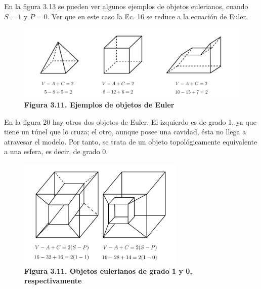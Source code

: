 En la figura 3.13 se pueden ver algunos ejemplos de objetos eulerianos, cuando $S = 1$ y $P = 0$. Ver que en este caso la Ec. 16 se reduce a la ecuación de Euler.

\begin{figure}[h]
\includegraphics[width=14cm]{Img/GEO/geo-euler1.jpg}
\centering
\caption{\textbf{Figura 3.11. \footnotesize{Ejemplos de objetos de Euler}}}
\end{figure}


En la figura 20 hay otros dos objetos de Euler. El izquierdo es de grado 1, ya que tiene un túnel que lo cruza; el otro, aunque posee una cavidad, ésta no llega a atravesar el modelo. Por tanto, se trata de un objeto topológicamente equivalente a una esfera, es decir, de grado 0.

\begin{figure}[h]
\includegraphics[width=8cm]{Img/GEO/geo-euler2.jpg}
\centering
\caption{\textbf{Figura 3.11. \footnotesize{Objetos eulerianos de grado 1 y 0, respectivamente}}}
\end{figure}


